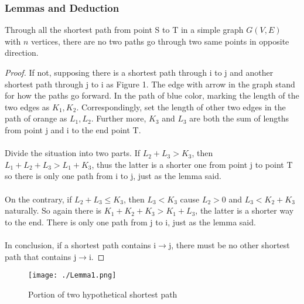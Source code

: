 \documentclass{elegantpaper}
\begin{document}
\subsubsection {Lemmas and Deduction}
\begin{lemma}	\quad Through all the shortest path from point S to T in a simple graph $G(V,E)$ with $n$ vertices, there are no two paths go through two same points in opposite direction.
\end{lemma}
\begin{proof} \quad If not, supposing there is a shortest path through i to j and another shortest path through j to i as Figure 1. The edge with arrow in the graph stand for how the paths go forward. In the path of blue color, marking the length of the two edges as $K_{1}, K_{2}$. Correspondingly, set the length of other two edges in the path of orange as $L_{1}, L_{2}$. Further more, $K_{3}$ and $L_{3}$ are both the sum of lengths from point j and i to the end point T.
\\ \hspace*{\fill} \\
Divide the situation into two parts. If $L_{2}+L_{3} > K_{3}$, then $L_{1}+L_{2}+L_{3} >L_{1}+ K_{3}$, thus the latter is a shorter one from point j to point T so there is only one path from i to j, just as the lemma said.
\\ \hspace*{\fill} \\
On the contrary, if $L_{2}+L_{3} \leq K_{3}$, then $L_{3} < K_{3}$ cause $L_{2} > 0$ and $L_{3} <K_{2}+K_{3} $ naturally. So again there is $K_{1}+K_{2}+K_{3} > K_{1}+L_{3}$, the latter is a shorter way to the end. There is only one path from j to i, just as the lemma said.
\\ \hspace*{\fill} \\
In conclusion, if a shortest path contains i$\rightarrow$j, there must be no other shortest path that contains j$\rightarrow$i.
\end{proof}
\begin{figure}[htbp]
	
	\centering
	
	\texttt{[image: ./Lemma1.png]}
	
	\caption{Portion of two hypothetical shortest path}
	
\end{figure}
\\ \hspace*{\fill} \\
\end{document}
